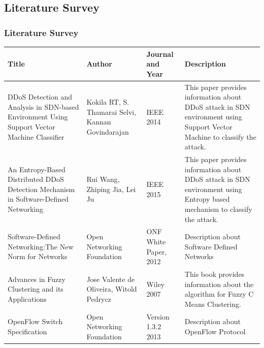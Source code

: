 \documentclass[10pt]{beamer}
\begin{document}



\begin{frame}
\section[]{Literature Survey}
\frametitle{Literature Survey}
\scriptsize
\begin{center}
\begin{tabular}{ | m{2cm} | m{2cm}| m{2cm} | m{3cm} | } 
\hline
\textbf{Title} & \textbf{Author} & \textbf{Journal and Year} & \textbf{Description} \\
\hline
DDoS Detection and Analysis in SDN-based Environment Using Support Vector Machine Classifier & 
Kokila RT, S. Thamarai Selvi, Kannan Govindarajan & 
IEEE 2014 & 
This paper provides information about DDoS attack in SDN environment using Support Vector Machine to classify the attack.\\ 
\hline
An Entropy-Based Distributed DDoS Detection Mechanism in Software-Defined Networking &
Rui Wang, Zhiping Jia, Lei Ju & 
IEEE 2015 & 
This paper provides information about DDoS attack in SDN environment using Entropy based mechanism to classify the attack.\\ 
\hline
Software-Defined Networking:The New Norm for Networks & 
Open Networking Foundation & 
ONF White Paper, 2012 & 
Description about Software Defined Networks\\
\hline
Advances in Fuzzy Clustering and its Applications & 
Jose Valente de Oliveira, Witold Pedrycz &
Wiley 2007 &
This book provides information about the algorithm for Fuzzy C Means Clustering.\\
\hline
OpenFlow Switch Specification& 
Open Networking Foundation &
Version 1.3.2 2013 &
Description about OpenFlow Protocol\\
\hline
\end{tabular}
\end{center}
\end{frame}
\end{document}
